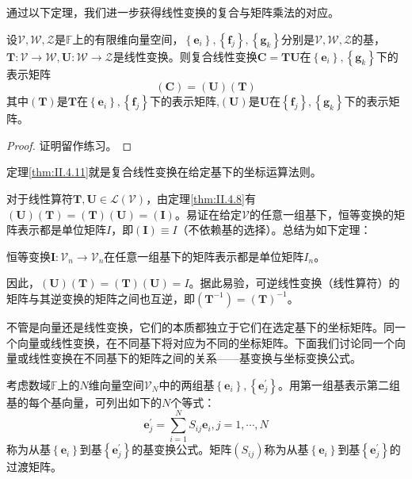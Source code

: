 \documentclass[main.tex]{subfiles}
\begin{document}
通过以下定理，我们进一步获得线性变换的复合与矩阵乘法的对应。
\begin{theorem}\label{thm:II.4.11}
设$\mathcal{V},\mathcal{W},\mathcal{Z}$是$\mathbb{F}$上的有限维向量空间，$\left\{\mathbf{e}_i\right\},\left\{\mathbf{f}_j\right\},\left\{\mathbf{g}_k\right\}$分别是$\mathcal{V},\mathcal{W},\mathcal{Z}$的基，$\mathbf{T}:\mathcal{V}\rightarrow\mathcal{W},\mathbf{U}:\mathcal{W}\rightarrow\mathcal{Z}$是线性变换。则复合线性变换$\mathbf{C}=\mathbf{TU}$在$\left\{\mathbf{e}_i\right\},\left\{\mathbf{g}_k\right\}$下的表示矩阵
\[\left(\mathbf{C}\right)=\left(\mathbf{U}\right)\left(\mathbf{T}\right)\]
其中$\left(\mathbf{T}\right)$是$\mathbf{T}$在$\left\{\mathbf{e}_i\right\},\left\{\mathbf{f}_j\right\}$下的表示矩阵,$\left(\mathbf{U}\right)$是$\mathbf{U}$在$\left\{\mathbf{f}_j\right\},\left\{\mathbf{g}_k\right\}$下的表示矩阵。
\end{theorem}
\begin{proof}
证明留作练习。
\end{proof}

定理\ref{thm:II.4.11}就是复合线性变换在给定基下的坐标运算法则。

对于线性算符$\mathbf{T},\mathbf{U}\in\mathcal{L}\left(\mathcal{V}\right)$，由定理\ref{thm:II.4.8}有$\left(\mathbf{U}\right)\left(\mathbf{T}\right)=\left(\mathbf{T}\right)\left(\mathbf{U}\right)=\left(\mathbf{I}\right)$。易证在给定$\mathcal{V}$的任意一组基下，恒等变换的矩阵表示都是单位矩阵$I$，即$\left(\mathbf{I}\right)\equiv I$（不依赖基的选择）。总结为如下定理：
\begin{theorem}
恒等变换$\mathbf{I}:\mathcal{V}_n\rightarrow\mathcal{V}_n$在任意一组基下的矩阵表示都是单位矩阵$I_n$。
\end{theorem}
因此，$\left(\mathbf{U}\right)\left(\mathbf{T}\right)=\left(\mathbf{T}\right)\left(\mathbf{U}\right)=I$。据此易验，可逆线性变换（线性算符）的矩阵与其逆变换的矩阵之间也互逆，即$\left(\mathbf{T}^{-1}\right)=\left(\mathbf{T}\right)^{-1}$。

不管是向量还是线性变换，它们的本质都独立于它们在选定基下的坐标矩阵。同一个向量或线性变换，在不同基下将对应为不同的坐标矩阵。下面我们讨论同一个向量或线性变换在不同基下的矩阵之间的关系——基变换与坐标变换公式。

考虑数域$\mathbb{F}$上的$N$维向量空间$\mathcal{V}_N$中的两组基$\left\{\mathbf{e}_i\right\},\left\{\mathbf{e}^\prime_j\right\}$。用第一组基表示第二组基的每个基向量，可列出如下的$N$个等式：
\[\mathbf{e}^\prime_j=\sum_{i=1}^NS_{ij}\mathbf{e}_i,j=1,\cdots,N\]
称为从基$\left\{\mathbf{e}_i\right\}$到基$\left\{\mathbf{e}^\prime_j\right\}$的基变换公式。矩阵$\left(S_{ij}\right)$称为从基$\left\{\mathbf{e}_i\right\}$到基$\left\{\mathbf{e}^\prime_j\right\}$的过渡矩阵。
\end{document}
